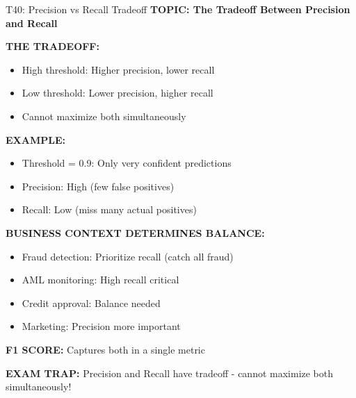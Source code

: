 \documentclass[8pt]{beamer}
\begin{document}
	\begin{frame}{T40: Precision vs Recall Tradeoff}
		\fontsize{6.5}{7.5}\selectfont
		\textbf{TOPIC: The Tradeoff Between Precision and Recall}
		
		\vspace{0.1cm}
		\textbf{THE TRADEOFF:}
		\begin{itemize}
			\item \textcolor{myblue}{High threshold:} Higher precision, lower recall
			\item \textcolor{myblue}{Low threshold:} Lower precision, higher recall
			\item Cannot maximize both simultaneously
		\end{itemize}
		
		\vspace{0.1cm}
		\textbf{EXAMPLE:}
		\begin{itemize}
			\item Threshold = 0.9: Only very confident predictions
			\item Precision: High (few false positives)
			\item Recall: Low (miss many actual positives)
		\end{itemize}
		
		\vspace{0.1cm}
		\textbf{BUSINESS CONTEXT DETERMINES BALANCE:}
		\begin{itemize}
			\item \textcolor{myblue}{Fraud detection:} Prioritize recall (catch all fraud)
			\item \textcolor{myblue}{AML monitoring:} High recall critical
			\item \textcolor{myblue}{Credit approval:} Balance needed
			\item \textcolor{myblue}{Marketing:} Precision more important
		\end{itemize}
		
		\vspace{0.1cm}
		\textbf{F1 SCORE:} Captures both in a single metric
		
		\textcolor{myred}{\textbf{EXAM TRAP:}} Precision and Recall have \textcolor{myblue}{tradeoff} - cannot maximize both simultaneously!
	\end{frame}
	
\end{document}
